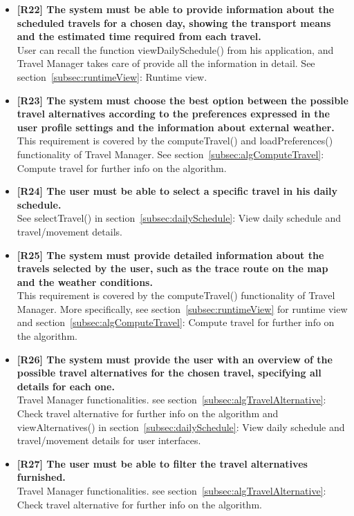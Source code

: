 \begin{itemize}
\item \textbf{[R22] The system must be able to provide information about the scheduled travels for a chosen
day, showing the transport means and the estimated time required from each travel.}\\
User can recall the function viewDailySchedule() from his application, and Travel Manager takes care of provide all the information in detail. See section~\ref{subsec:runtimeView}: Runtime view.

\item \textbf{[R23] The system must choose the best option between the possible travel alternatives according
to the preferences expressed in the user profile settings and the information about external weather.}\\
This requirement is covered by the computeTravel() and loadPreferences() functionality of Travel Manager. See section~\ref{subsec:algComputeTravel}: Compute travel for further info on the algorithm.

\item \textbf{[R24] The user must be able to select a specific travel in his daily schedule.}\\
See selectTravel() in section~\ref{subsec:dailySchedule}: View daily schedule and travel/movement details.

\item \textbf{[R25] The system must provide detailed information about the travels selected by the user, such
as the trace route on the map and the weather conditions.}\\
This requirement is covered by the computeTravel() functionality of Travel Manager. More specifically, see section~\ref{subsec:runtimeView} for runtime view and section~\ref{subsec:algComputeTravel}: Compute travel for further info on the algorithm.

\item \textbf{[R26] The system must provide the user with an overview of the possible travel alternatives for the chosen travel, specifying all details for each one.}\\
Travel Manager functionalities. see section~\ref{subsec:algTravelAlternative}: Check travel alternative for further info on the algorithm and viewAlternatives() in section~\ref{subsec:dailySchedule}: View daily schedule and travel/movement details for user interfaces.

\item \textbf{[R27] The user must be able to filter the travel alternatives furnished.}\\
Travel Manager functionalities. see section~\ref{subsec:algTravelAlternative}: Check travel alternative for further info on the algorithm.


\end{itemize}
